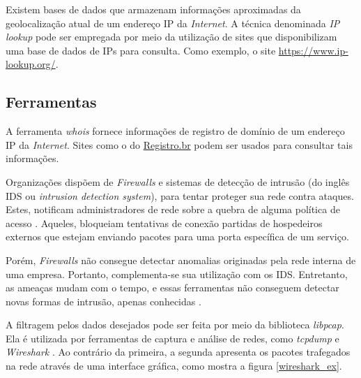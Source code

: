     \hspace{1cm}
    Existem bases de dados que armazenam informações aproximadas da geolocalização atual de um endereço IP da \textit{Internet}. A técnica denominada \textit{IP lookup} pode ser empregada por meio da utilização de sites que disponibilizam uma base de dados de IPs para consulta. Como exemplo, o site \href{https://www.ip-lookup.org/}{https://www.ip-lookup.org/}. 
    
    \subsection{Ferramentas} \label{cap4_ferramentas}

    \hspace{1cm}
    A ferramenta \textit{whois} fornece informações de registro de domínio de um endereço IP da \textit{Internet}. Sites como o do \href{https://registro.br/tecnologia/ferramentas/whois/}{Registro.br} podem ser usados para consultar tais informações.

    \vspace{4mm}

    \hspace{1cm}
    Organizações dispõem de \textit{Firewalls} e sistemas de detecção de intrusão (do inglês IDS ou \textit{intrusion detection system}), para tentar proteger sua rede contra ataques. Estes, 
    notificam administradores de rede sobre a quebra de alguma política de acesso \cite{bejtlich2004}.
    Aqueles, bloqueiam tentativas de conexão partidas de hospedeiros externos que estejam enviando pacotes para uma porta específica de um serviço.
    
    \vspace{4mm}
    
    \hspace{1cm}
    Porém, \textit{Firewalls} não consegue detectar anomalias originadas pela rede interna de uma empresa. Portanto, complementa-se sua utilização com os IDS. Entretanto, as ameaças mudam com o tempo, e essas ferramentas não conseguem detectar novas formas de intrusão, apenas conhecidas \cite{capobianco2019}.

    \vspace{4mm}

    \hspace{1cm}
    A filtragem pelos dados desejados pode ser feita por meio da biblioteca \textit{libpcap}. Ela é utilizada por ferramentas de captura e análise de redes, como \textit{tcpdump} e \textit{Wireshark} \cite{bejtlich2004}. Ao contrário da primeira, a segunda apresenta os pacotes trafegados na rede através de uma interface gráfica, como mostra a figura \ref{wireshark_ex}. 
    
